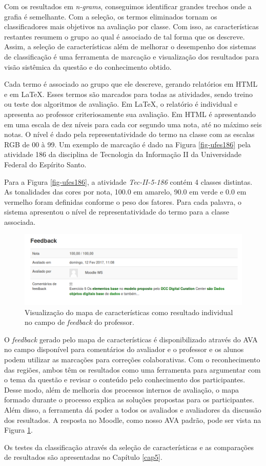 Com os resultados em \textit{n-grams}, conseguimos identificar grandes trechos onde a grafia é semelhante. Com a seleção, os termos eliminados tornam os classificadores mais objetivos na avaliação por classe. Com isso, as características restantes resumem o grupo ao qual é associado de tal forma que os descreve. Assim, a seleção de características além de melhorar o desempenho dos sistemas de classificação é uma ferramenta de marcação e visualização dos resultados para visão sistêmica da questão e do conhecimento obtido.

Cada termo é associado ao grupo que ele descreve, gerando relatórios em HTML e em \LaTeX \cite{goossens1994}. Esses termos são marcados para todas as atividades, sendo treino ou teste dos algoritmos de avaliação. Em \LaTeX, o relatório é individual e apresenta ao professor criteriosamente sua avaliação. Em HTML é apresentando em uma escala de dez níveis para cada cor segundo uma nota, até no máximo seis notas. O nível é dado pela representatividade do termo na classe com as escalas RGB de 00 à 99. Um exemplo de marcação é dado na Figura \ref{fig-ufes186}  pela atividade 186 da disciplina de Tecnologia da Informação II da Universidade Federal do Espírito Santo.

Para a Figura \ref{fig-ufes186}, a atividade \textit{Tec-II-5-186} contém 4 classes distintas. As tonalidades das cores por nota, 100.0 em amarelo, 90.0 em verde e 0.0 em vermelho foram definidas conforme o peso dos fatores. Para cada palavra, o sistema apresentou o nível de representatividade do termo para a classe associada.

\begin{figure}[b]
\centering
\includegraphics[width=\textwidth]{./img/mapa-ava.png}
\caption{Visualização do mapa de características como resultado individual no campo de \textit{feedback} do professor.}
\label{mapa-ava}
\end{figure}

O \textit{feedback} gerado pelo mapa de características é disponibilizado através do AVA no campo disponível para comentários do avaliador e o professor e os alunos podem utilizar as marcações para correções colaborativas. Com o reconhecimento das regiões, ambos têm os resultados como uma ferramenta para argumentar com o tema da questão e revisar o conteúdo pelo conhecimento dos participantes. Desse modo, além de melhoria dos processos internos de avaliação, o mapa formado durante o processo explica as soluções propostas para os participantes. Além disso, a ferramenta dá poder a todos os avaliados e avaliadores da discussão dos resultados. A resposta no Moodle, como nosso AVA padrão, pode ser vista na Figura \ref{mapa-ava}.

Os testes da classificação através da seleção de características e as comparações de resultados são apresentadas no Capítulo \ref{cap5}.